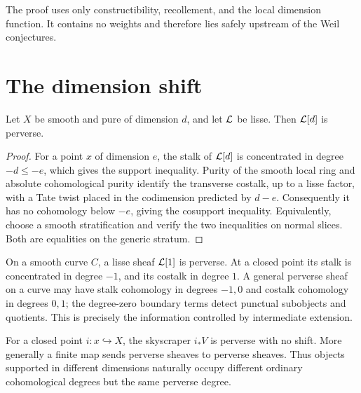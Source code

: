 \begin{perversebox}
The proof uses only constructibility, recollement, and the local dimension
function.  It contains no weights and therefore lies safely upstream of the
Weil conjectures.
\end{perversebox}

\section{The dimension shift}

\begin{proposition}
\label{prop:lisse-shift-perverse}
Let \(X\) be smooth and pure of dimension \(d\), and let \(\mathcal L\) be lisse.
Then \(\mathcal L[d]\) is perverse.
\end{proposition}

\begin{proof}
For a point \(x\) of dimension \(e\), the stalk of \(\mathcal L[d]\) is concentrated
in degree \(-d\leq-e\), which gives the support inequality.  Purity of the
smooth local ring and absolute cohomological purity identify the transverse
costalk, up to a lisse factor, with a Tate twist placed in the codimension
predicted by \(d-e\).  Consequently it has no cohomology below \(-e\), giving
the cosupport inequality.  Equivalently, choose a smooth stratification and
verify the two inequalities on normal slices.  Both are equalities on the
generic stratum.
\end{proof}

\begin{example}
On a smooth curve \(C\), a lisse sheaf \(\mathcal L[1]\) is perverse.  At a closed
point its stalk is concentrated in degree \(-1\), and its costalk in degree
\(1\).  A general perverse sheaf on a curve may have stalk cohomology in
degrees \(-1,0\) and costalk cohomology in degrees \(0,1\); the degree-zero
boundary terms detect punctual subobjects and quotients.  This is precisely
the information controlled by intermediate extension.
\end{example}

\begin{example}
For a closed point \(i:x\hookrightarrow X\), the skyscraper \(i_*V\) is
perverse with no shift.  More generally a finite map sends perverse sheaves to
perverse sheaves.  Thus objects supported in different dimensions naturally
occupy different ordinary cohomological degrees but the same perverse degree.
\end{example}

